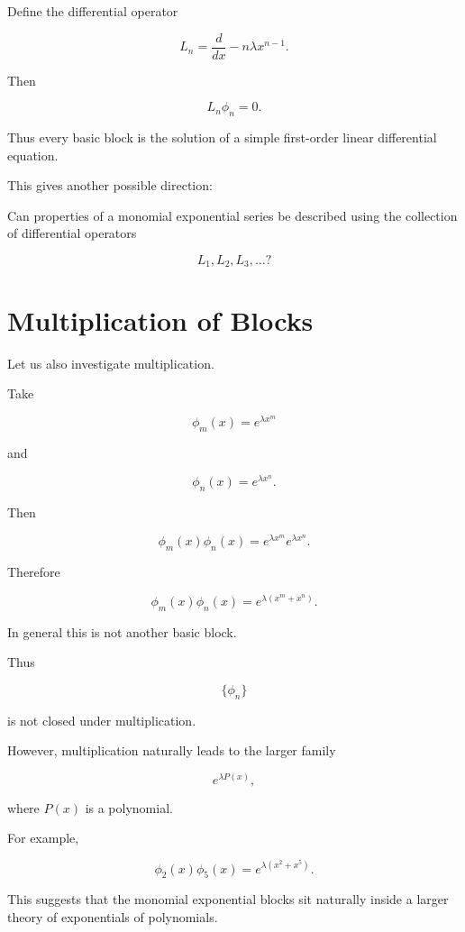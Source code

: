 Define the differential operator

\[
L_n
=
\frac{d}{dx}
-
n\lambda x^{n-1}.
\]

Then

\[
\boxed{
L_n\phi_n=0.
}
\]

Thus every basic block is the solution of a simple first-order linear
differential equation.

This gives another possible direction:

\begin{question}

Can properties of a monomial exponential series be described using
the collection of differential operators

\[
L_1,L_2,L_3,\ldots?
\]

\end{question}

\section{Multiplication of Blocks}

Let us also investigate multiplication.

Take

\[
\phi_m(x)=e^{\lambda x^m}
\]

and

\[
\phi_n(x)=e^{\lambda x^n}.
\]

Then

\[
\phi_m(x)\phi_n(x)
=
e^{\lambda x^m}
e^{\lambda x^n}.
\]

Therefore

\[
\boxed{
\phi_m(x)\phi_n(x)
=
e^{\lambda(x^m+x^n)}.
}
\]

In general this is not another basic block.

Thus

\[
\{\phi_n\}
\]

is not closed under multiplication.

However, multiplication naturally leads to the larger family

\[
\boxed{
e^{\lambda P(x)},
}
\]

where \(P(x)\) is a polynomial.

For example,

\[
\phi_2(x)\phi_5(x)
=
e^{\lambda(x^2+x^5)}.
\]

This suggests that the monomial exponential blocks sit naturally
inside a larger theory of exponentials of polynomials.


